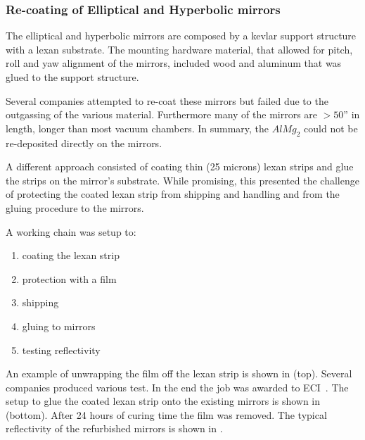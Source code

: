 \subsubsection{Re-coating of Elliptical and Hyperbolic mirrors}

The elliptical and hyperbolic mirrors are composed by a kevlar support structure with a lexan substrate. The mounting hardware
material, that allowed for pitch, roll and yaw alignment of the mirrors, included wood and aluminum that was glued to the support structure.

Several companies attempted to re-coat these mirrors but failed due to the outgassing of the various material. Furthermore many of the mirrors
are $> 50$'' in length, longer than most vacuum chambers. In summary, the $AlMg_2$ could not be re-deposited directly on the mirrors.

A different approach consisted of coating thin (25 microns) lexan strips and glue the strips on the mirror's substrate. While promising, this
presented the challenge of protecting the coated lexan strip from shipping and handling and from the gluing procedure to the mirrors.

A working chain was setup to:

\begin{enumerate}
	\item coating the lexan strip
	\item protection with a film
	\item shipping
	\item gluing to mirrors
	\item testing reflectivity
\end{enumerate}

An example of unwrapping the film off the lexan strip is shown in  (top). Several companies produced various test. In the end the
job was awarded to ECI~\cite{ECI}.
The setup to glue the coated lexan strip onto the existing mirrors is shown in  (bottom).
After 24 hours of curing time the film was removed.
The typical reflectivity of the refurbished mirrors is shown in .

